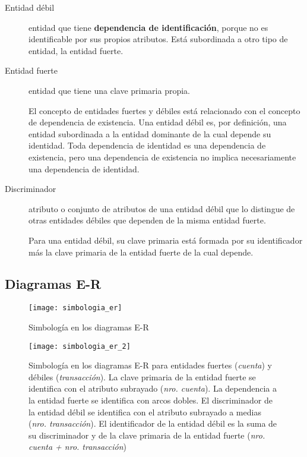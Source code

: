 \documentclass[a4paper, twoside]{article}
\begin{document}
\begin{description}
	\item[Entidad débil] entidad que tiene \textbf{dependencia de identificación}, porque no es identificable por sus propios atributos. Está subordinada a otro tipo de entidad, la entidad fuerte.

	\item[Entidad fuerte] entidad que tiene una clave primaria propia.

	El concepto de entidades fuertes y débiles está relacionado con el concepto de dependencia de existencia. Una entidad débil es, por definición, una entidad subordinada a la entidad dominante de la cual depende su identidad. Toda dependencia de identidad es una dependencia de existencia, pero una dependencia de existencia no implica necesariamente una dependencia de identidad.

	\item[Discriminador] atributo o conjunto de atributos de una entidad débil que lo distingue de otras entidades débiles que dependen de la misma entidad fuerte.
	
	Para una entidad débil, su clave primaria está formada por su identificador más la clave primaria de la entidad fuerte de la cual depende.
\end{description}

\subsection{Diagramas E-R}
\begin{figure}[H]
	\centering
	\texttt{[image: simbologia\_er]}
	\caption{Simbología en los diagramas E-R}
\end{figure}

\begin{figure}[H]
	\centering
	\texttt{[image: simbologia\_er\_2]}
	\caption{Simbología en los diagramas E-R para entidades fuertes (\emph{cuenta}) y débiles (\emph{transacción}). La clave primaria de la entidad fuerte se identifica con el atributo subrayado (\emph{nro. cuenta}). La dependencia a la entidad fuerte se identifica con arcos dobles. El discriminador de la entidad débil se identifica con el atributo subrayado a medias (\emph{nro. transacción}). El identificador de la entidad débil es la suma de su discriminador y de la clave primaria de la entidad fuerte (\emph{nro. cuenta + nro. transacción})}
\end{figure}
\end{document}
